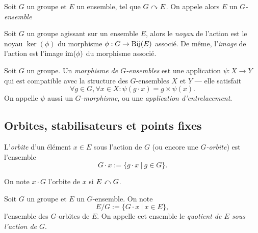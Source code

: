 \begin{notn}
	Soit $G$ un groupe et $E$ un ensemble, tel que $G \curvearrowright E$.
	On appele alors $E$ un \emph{$G$-ensemble}
\end{notn}

\begin{defn}
	Soit $G$ un groupe agissant sur un ensemble $E$,
	alors le \emph{noyau} de l'action est le noyau $\ker(\phi)$ du morphisme
	$\phi : G \to \operatorname{Bij}(E)$ associé. De même, l'\emph{image}
	de l'action est l'image $\operatorname{im}(\phi)$ du morphisme associé.
\end{defn}

\begin{defn}
	Soit $G$ un groupe. Un \emph{morphisme de $G$-ensembles} est une
	application $\psi : X \to Y$ qui est compatible avec
	la structure des $G$-ensembles $X$ et $Y$ --- elle satisfait
	\begin{equation*}
		\forall g \in G, \forall x \in X:
			\psi(g \cdot x) = g \times \psi(x).
	\end{equation*}
	On appelle $\psi$ aussi un \emph{$G$-morphisme},
	ou une \emph{application d'entrelacement}.
\end{defn}

\subsection{Orbites, stabilisateurs et points fixes}

\begin{defn}
	L'\emph{orbite} d'un élément $x \in E$ sous l'action de $G$
	(ou encore une \emph{$G$-orbite}) est l'ensemble
	\begin{equation*}
		G \cdot x := \{g \cdot x\ |\ g \in G\}.
	\end{equation*}
\end{defn}

\begin{notn}
	On note $x \cdot G$ l'orbite de $x$ si $E \curvearrowleft G$.
\end{notn}

\begin{defn}
	Soit $G$ un groupe et $E$ un $G$-ensemble. 
	On note
	\begin{equation*}
		E / G := \{ G \cdot x\ |\ x \in E\}, 	
	\end{equation*}
	l'ensemble des $G$-orbites de $E$. On appelle cet
	ensemble le \emph{quotient de $E$ sous l'action de $G$}.
\end{defn}

